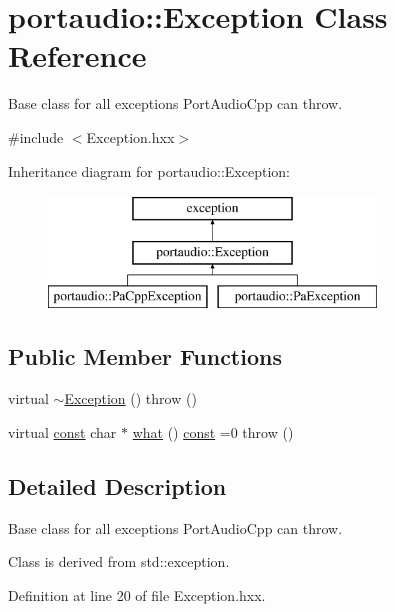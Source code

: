 \hypertarget{classportaudio_1_1_exception}{}\section{portaudio\+:\+:Exception Class Reference}
\label{classportaudio_1_1_exception}


Base class for all exceptions Port\+Audio\+Cpp can throw.  




{\ttfamily \#include $<$Exception.\+hxx$>$}

Inheritance diagram for portaudio\+:\+:Exception\+:\begin{figure}[H]
\begin{center}
\leavevmode
\includegraphics[height=3.000000cm]{classportaudio_1_1_exception}
\end{center}
\end{figure}
\subsection*{Public Member Functions}
\begin{DoxyCompactItemize}
\item 
virtual \hyperlink{classportaudio_1_1_exception_adf147e2b88f398a7203605a8f90c3d60}{$\sim$\+Exception} ()  throw ()
\item 
virtual \hyperlink{getopt1_8c_a2c212835823e3c54a8ab6d95c652660e}{const} char $\ast$ \hyperlink{classportaudio_1_1_exception_a8bd220db3a08079360fc17d553e5b3a8}{what} () \hyperlink{getopt1_8c_a2c212835823e3c54a8ab6d95c652660e}{const}  =0  throw ()
\end{DoxyCompactItemize}


\subsection{Detailed Description}
Base class for all exceptions Port\+Audio\+Cpp can throw. 

Class is derived from std\+::exception. 

Definition at line 20 of file Exception.\+hxx.




